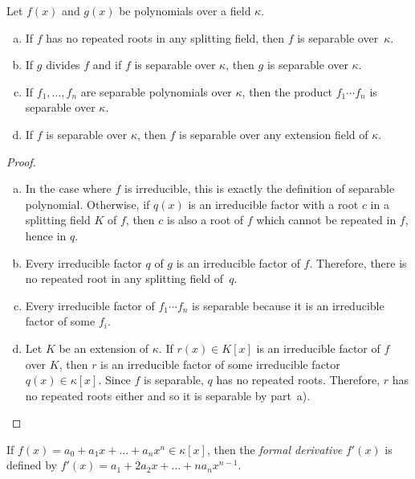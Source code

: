 \begin{lem}\label{lem:separable-polynomials}
    Let\/ $f(x)$ and\/ $g(x)$ be polynomials over a field\/ $\kappa$.
    \begin{enumerate}[a), font=\upshape]
        \item If\/ $f$ has no repeated roots in any splitting field, then\/ $f$ is separable over\/~$\kappa$.
        \item If\/ $g$ divides\/ $f$ and if\/ $f$ is separable over\/ $\kappa$, then\/ $g$ is separable over\/ $\kappa$.
        \item If\/ $f_1, \dots, f_n$ are separable polynomials over\/ $\kappa$, then the product\/ $f_1 \cdots f_n$ is separable over\/ $\kappa$.
        \item If\/ $f$ is separable over\/ $\kappa$, then\/ $f$ is separable over any extension field of\/ $\kappa$.
    \end{enumerate}
\end{lem}

\begin{proof}${}$
    \begin{enumerate}[a), font=\upshape]
        \item In the case where $f$ is irreducible, this is exactly the definition of separable polynomial. Otherwise, if $q(x)$ is an irreducible factor with a root $c$ in a splitting field $K$ of $f$, then $c$ is also a root of $f$ which cannot be repeated in $f$, hence in $q$.

        \item Every irreducible factor $q$ of $g$ is an irreducible factor of $f$. Therefore, there is no repeated root in any splitting field of~$q$.

        \item Every irreducible factor of $f_1\cdots f_n$ is separable because it is an irreducible factor of some $f_i$.

        \item Let $K$ be an extension of $\kappa$. If $r(x)\in K[x]$ is an irreducible factor of $f$ over $K$, then $r$ is an irreducible factor of some irreducible factor $q(x)\in\kappa[x]$. Since $f$ is separable, $q$ has no repeated roots. Therefore, $r$ has no repeated roots either and so it is separable by part~a). %
    \end{enumerate}    
\end{proof}

\begin{defn}
    If\/ $f(x) = a_0 + a_1x + \dots + a_nx^n \in\kappa[x]$, then the \textsl{formal derivative\/} $f'(x)$\/ is\/ defined\/ by\/ $f'(x) = a_1 + 2a_2x + \dots + na_nx^{n-1}$.
\end{defn}


